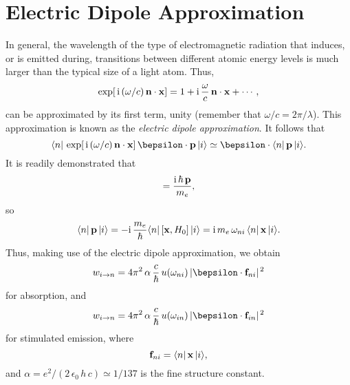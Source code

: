 \section{Electric Dipole Approximation}\label{sdipole}
In general, the wavelength of the type of
electromagnetic radiation that induces, or is emitted during, transitions
between different atomic energy levels is much larger than the 
typical size of
a light atom. Thus,
\begin{equation}\label{e6.260}
\exp[\,{\rm i}\,(\omega/c)\,{\bf n}\cdot{\bf x}] = 1
+ {\rm i}\,\frac{\omega}{c} \,{\bf n}\cdot{\bf x} + \cdots,
\end{equation}
can be approximated by its first term, unity (remember that $\omega/c =2\pi/\lambda$).
This approximation is known as the {\em electric dipole approximation}. 
It follows that
\begin{equation}
\langle n|\, \exp[\,{\rm i}\,(\omega/c)\,{\bf n}\cdot{\bf x}]\,
\bepsilon\cdot{\bf p}\, |i\rangle \simeq  \bepsilon \cdot
\langle n|\,{\bf p}\,|i\rangle.
\end{equation}
It is readily demonstrated that
\begin{equation}
[{\bf x}, H_0] = \frac{{\rm i}\, \hbar \,{\bf p}}{m_e},
\end{equation}
so
\begin{equation}
\langle n|\, {\bf p}\,|i\rangle = -{\rm i}\, \frac{m_e}{\hbar}
\langle n|\,[{\bf x}, H_0]\,|i\rangle 
= {\rm i}\,m_e\,\omega_{ni}\, \langle n|\,{\bf x}\,|i\rangle.
\end{equation}
Thus, making use of the electric dipole approximation, we obtain
\begin{equation}\label{e8.155s}
w_{i\rightarrow n} = 4\pi^2\,\alpha\,\frac{c}{\hbar}\,u(\omega_{ni})\,|\bepsilon\cdot{\bf f}_{ni}|^{\,2}
\end{equation}
for absorption, and 
\begin{equation}\label{e8.156s}
w_{i\rightarrow n} = 4\pi^2\,\alpha\,\frac{c}{\hbar}\,u(\omega_{in})\,|\bepsilon\cdot{\bf f}_{in}|^{\,2}
\end{equation}
for stimulated emission, where
\begin{equation}
{\bf f}_{ni} =\langle n|\,{\bf x}\,|i\rangle,
\end{equation}
and  $\alpha = e^2/(2\,\epsilon_0\, h \,c) \simeq 1/137$ is the fine structure constant. 

